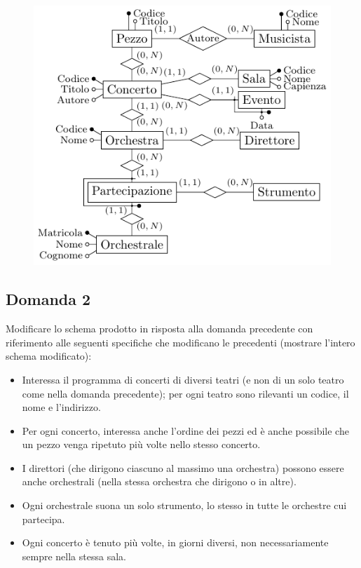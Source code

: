 \documentclass{article}
\numberwithin{equation}{subsection}
\begin{document}
\begin{figure}[H]%
    \centering
    \includegraphics[scale=1.25]{schema_er_es_3.pdf}%
\end{figure}

\subsection{Domanda 2}

Modificare lo schema prodotto in risposta alla domanda precedente con riferimento alle seguenti specifiche che modificano le precedenti 
(mostrare l'intero schema modificato):
\begin{itemize}
    \item Interessa il programma di concerti di diversi teatri (e non di un solo teatro come nella domanda precedente); per ogni teatro sono rilevanti un codice, il nome e l'indirizzo. 
    \item Per ogni concerto, interessa anche l'ordine dei pezzi ed è anche possibile che un pezzo venga ripetuto più volte nello stesso concerto. 
    \item I direttori (che dirigono ciascuno al massimo una orchestra) possono essere anche orchestrali (nella stessa orchestra che dirigono o in altre). 
    \item Ogni orchestrale suona un solo strumento, lo stesso in tutte le orchestre cui partecipa.
    \item Ogni concerto è tenuto più volte, in giorni diversi, non necessariamente sempre nella stessa sala. 
\end{itemize}
\end{document}
